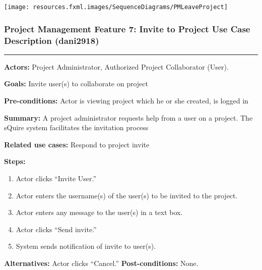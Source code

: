\documentclass[twoside,letterpaper]{article}
\begin{document}
\bigskip

\texttt{[image: resources.fxml.images/SequenceDiagrams/PMLeaveProject]}

\newpage




\subsubsection[Project Management Feature 7: Invite to Project Use Case Description (dani2918)]{\rmfamily\bfseries\color{black}
	Project Management Feature 7: Invite to Project Use Case Description  (dani2918)}
	\label{pm:uc5}
\hypertarget{RefHeading22059017292}{}
\bigskip

\vspace{2pt}
\hrule
\vspace{8pt}
\noindent \textbf{Actors:} Project Administrator, Authorized Project Collaborator (User).  \newline

\noindent \textbf{Goals:} Invite user(s) to collaborate on project \newline

\noindent  \textbf{Pre-conditions:} Actor is viewing project which he or she created, is logged in   \newline

\noindent \textbf{Summary:} A project administrator requests help from a user on a project. The sQuire system facilitates the invitation process  \newline

\noindent \textbf{Related use cases:} Respond to project invite\newline

\noindent \textbf{Steps:} \begin{enumerate}
  \item Actor clicks ``Invite User.''
  \item Actor enters the username(s) of the user(s) to be invited to the project.
  \item Actor enters any message to the user(s) in a text box.
  \item Actor clicks ``Send invite.''
  \item System sends notification of invite to user(s).
 \end{enumerate}
 
\noindent  \textbf{Alternatives:} Actor clicks ``Cancel.''
 \textbf{Post-conditions:} None.  \newline
 
\end{document}
